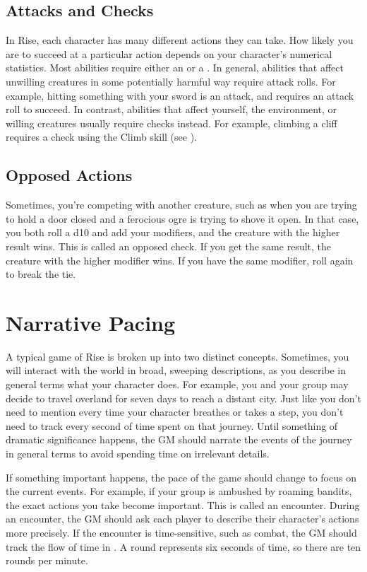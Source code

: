     \subsection{Attacks and Checks}
        In Rise, each character has many different actions they can take.
        How likely you are to succeed at a particular action depends on your character's numerical statistics.
        Most abilities require either an  or a .
        In general, abilities that affect unwilling creatures in some potentially harmful way require attack rolls.
        For example, hitting something with your sword is an attack, and requires an attack roll to succeed.
        In contrast, abilities that affect yourself, the environment, or willing creatures usually require checks instead.
        For example, climbing a cliff requires a check using the Climb skill (see ).

    \subsection{Opposed Actions}
        Sometimes, you're competing with another creature, such as when you are trying to hold a door closed and a ferocious ogre is trying to shove it open.
        In that case, you both roll a d10 and add your modifiers, and the creature with the higher result wins.
        This is called an opposed check.
        If you get the same result, the creature with the higher modifier wins.
        If you have the same modifier, roll again to break the tie.

\section{Narrative Pacing}
    A typical game of Rise is broken up into two distinct concepts.
    Sometimes, you will interact with the world in broad, sweeping descriptions, as you describe in general terms what your character does.
    For example, you and your group may decide to travel overland for seven days to reach a distant city.
    Just like you don't need to mention every time your character breathes or takes a step, you don't need to track every second of time spent on that journey.
    Until something of dramatic significance happens, the GM should narrate the events of the journey in general terms to avoid spending time on irrelevant details.

    If something important happens, the pace of the game should change to focus on the current events.
    For example, if your group is ambushed by roaming bandits, the exact actions you take become important.
    This is called an encounter.
    During an encounter, the GM should ask each player to describe their character's actions more precisely.
    If the encounter is time-sensitive, such as combat, the GM should track the flow of time in .
    A round represents six seconds of time, so there are ten rounds per minute.


